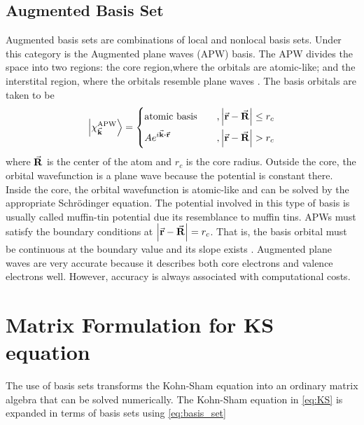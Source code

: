 \subsection{Augmented Basis Set}
Augmented basis sets are combinations of local and nonlocal basis sets. Under this category is the Augmented plane waves (APW) basis. The APW divides the space into two regions: the core region,where the orbitals are atomic-like; and the interstital region, where the orbitals  resemble plane waves \citep{Slater1953}. The basis orbitals are taken to be \citep{Sjoestedt2000}
\begin{equation}
	\ket{\chi^{\text{APW}}_{\va{k}}} =
	\begin{dcases}
		\text{atomic basis}    \quad & , \abs{\va{r}-\va{R}} \leq r_c \\
		A e^{i \va{k} \vdot \va{r}}  & , \abs{\va{r}-\va{R}} > r_c    \\
	\end{dcases}
\end{equation}
where $\va{R}$ is the center of the atom and $r_c$ is the core radius. Outside the core, the orbital wavefunction is a plane wave because the potential is constant there. Inside the core, the orbital wavefunction is atomic-like and can be solved by the appropriate Schr\"{o}dinger equation. The potential involved in this type of basis is usually called muffin-tin potential due its resemblance to muffin tins. APWs must satisfy the boundary conditions at $\abs{\va{r}-\va{R}} = r_c$. That is, the basis orbital must be continuous at the boundary value and its slope exists \citep{Andersen1975}. Augmented plane waves are very accurate because it describes both core electrons and valence electrons well. However, accuracy is always associated with computational costs.



\section{Matrix Formulation for KS equation}
The use of basis sets transforms the Kohn-Sham equation into an ordinary matrix algebra  that can be solved numerically. The Kohn-Sham equation in \eqref{eq:KS} is expanded in terms of basis sets using \eqref{eq:basis_set}

